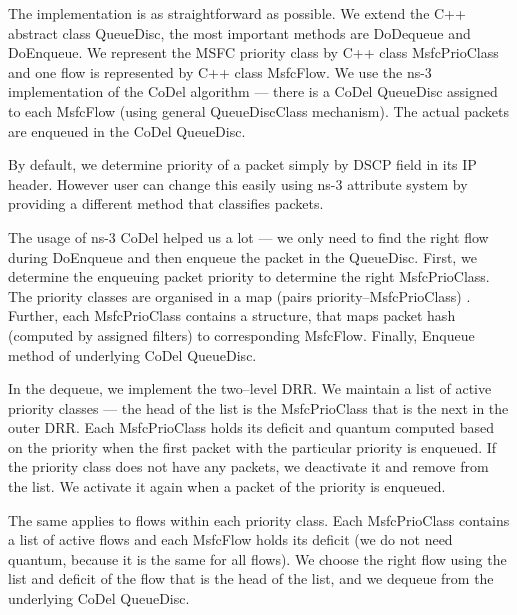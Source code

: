 The implementation is as straightforward as possible. We extend the C++ abstract class QueueDisc, the most important methods are DoDequeue and DoEnqueue. We represent the MSFC priority class by C++ class MsfcPrioClass and one flow is represented by C++ class MsfcFlow. We use the ns-3 implementation of the CoDel algorithm --- there is a CoDel QueueDisc assigned to each MsfcFlow (using general QueueDiscClass mechanism). The actual packets are enqueued in the CoDel QueueDisc.

By default, we determine priority of a packet simply by DSCP field in its IP header. However user can change this easily using ns-3 attribute system by providing a different method that classifies packets. 

The usage of ns-3 CoDel helped us a lot  --- we only need  to find the right flow during DoEnqueue and then enqueue the packet in the  QueueDisc. First, we determine the enqueuing packet priority to determine the right MsfcPrioClass. The priority classes are organised in a map (pairs priority--MsfcPrioClass) . Further, each MsfcPrioClass contains a structure, that maps packet hash (computed by assigned filters) to  corresponding MsfcFlow. Finally,   Enqueue method of underlying CoDel QueueDisc.

In the dequeue, we implement the two--level DRR. We maintain a list of active priority classes --- the head of the list is the MsfcPrioClass that is the next in the outer DRR. Each MsfcPrioClass holds its deficit and quantum computed based on the priority when the first packet with the particular priority is enqueued. If the priority class does not have any packets, we deactivate it and remove from the list. We activate it again when a packet of the priority is enqueued.

The same applies to flows within each priority class. Each MsfcPrioClass contains a list of active flows and each MsfcFlow holds its deficit (we do not need quantum, because it is the same for all flows). We choose the right flow using the list and deficit of the flow that is the head of the list, and we dequeue from the underlying CoDel QueueDisc.   












